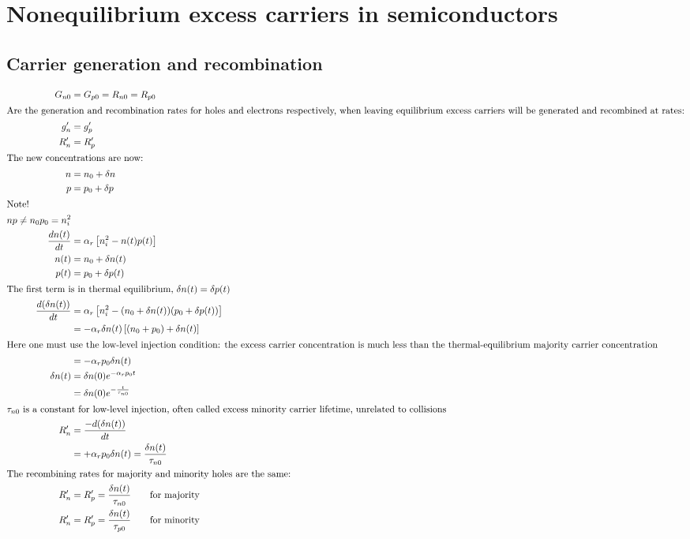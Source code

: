 \documentclass[article,oneside]{memoir}
\begin{document}
\part{Nonequilibrium excess carriers in semiconductors}
\chapter{Carrier generation and recombination}
\begin{align*}
        G_{n0}&=G_{p0}=R_{n0}=R_{p0}\\
        \intertext{Are the generation and recombination rates for holes and electrons respectively, when leaving equilibrium excess carriers will be generated and recombined at rates:}
        g_n'&=g_p'\\
        R_n'&=R_p'\\
        \intertext{The new concentrations are now:}
        n&=n_0+\delta n\\
        p&=p_0+\delta p\\
        \intertext{Note!}
        np\neq n_0p_0=n_i^2\\
        \frac{dn(t)}{dt}&= \alpha_r\left[ n_i^2-n(t)p(t) \right]\\
        n(t)&=n_0+\delta n(t)\\
        p(t)&=p_0+\delta p(t)\\
        \intertext{The first term is in thermal equilibrium, $\delta n(t) = \delta p(t)$}
        \frac{d(\delta n(t))}{dt}&=\alpha_r\left[ n_i^2-(n_0+\delta n(t))(p_0+\delta p(t)) \right]\\
        &=-\alpha_r\delta n(t)\left[ (n_0+p_0)+\delta n(t) \right]\\
        \intertext{Here one must use the low-level injection condition: the excess carrier concentration is much less than the thermal-equilibrium majority carrier concentration}
        &=-\alpha_rp_0\delta n(t)\\
        \delta n(t)&=\delta n(0)e^{-\alpha_rp_0t}\\
        &=\delta n(0)e^{-\frac{t}{\tau_{n0}}}\\
        \intertext{$\tau_{n0}$ is a constant for low-level injection, often called excess minority carrier lifetime, unrelated to collisions}
        R_n'&=\frac{-d(\delta n(t))}{dt}\\
        &=+\alpha_rp_0\delta n(t)=\frac{\delta n(t)}{\tau_{n0}}\\
        \intertext{The recombining rates for majority and minority holes are the same:}
        R_n'&=R_p'=\frac{\delta n(t)}{\tau_{n0}}\qquad \textup{for majority}\\
        R_n'&=R_p'=\frac{\delta n(t)}{\tau_{p0}}\qquad \textup{for minority}
\end{align*}
\end{document}
